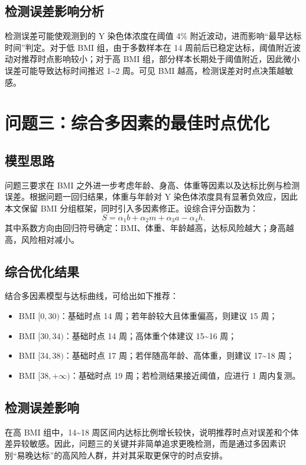 ﻿\documentclass[12pt,a4paper]{article}
\begin{document}
\subsection{检测误差影响分析}
检测误差可能使观测到的 Y 染色体浓度在阈值 4\% 附近波动，进而影响“最早达标时间”判定。对于低 BMI 组，由于多数样本在 14 周前后已稳定达标，阈值附近波动对推荐时点影响较小；对于高 BMI 组，部分样本长期处于阈值附近，因此微小误差可能导致达标时间推迟 1\textasciitilde2 周。可见 BMI 越高，检测误差对时点决策越敏感。

\section{问题三：综合多因素的最佳时点优化}
\subsection{模型思路}
问题三要求在 BMI 之外进一步考虑年龄、身高、体重等因素以及达标比例与检测误差。根据问题一回归结果，体重与年龄对 Y 染色体浓度具有显著负效应，因此本文保留 BMI 分组框架，同时引入多因素修正。设综合评分函数为：
\[
S = \alpha_1 b + \alpha_2 m + \alpha_3 a - \alpha_4 h.
\]
其中系数方向由回归符号确定：BMI、体重、年龄越高，达标风险越大；身高越高，风险相对减小。

\subsection{综合优化结果}
结合多因素模型与达标曲线，可给出如下推荐：
\begin{itemize}
    \item BMI $[0,30)$：基础时点 14 周；若年龄较大且体重偏高，则建议 15 周；
    \item BMI $[30,34)$：基础时点 14 周；高体重个体建议 15\textasciitilde16 周；
    \item BMI $[34,38)$：基础时点 17 周；若伴随高年龄、高体重，则建议 17\textasciitilde18 周；
    \item BMI $[38,+\infty)$：基础时点 19 周；若检测结果接近阈值，应进行 1 周内复测。
\end{itemize}

\subsection{检测误差影响}
在高 BMI 组中，14\textasciitilde18 周区间内达标比例增长较快，说明推荐时点对误差和个体差异较敏感。因此，问题三的关键并非简单追求更晚检测，而是通过多因素识别“易晚达标”的高风险人群，并对其采取更保守的时点安排。
\end{document}
